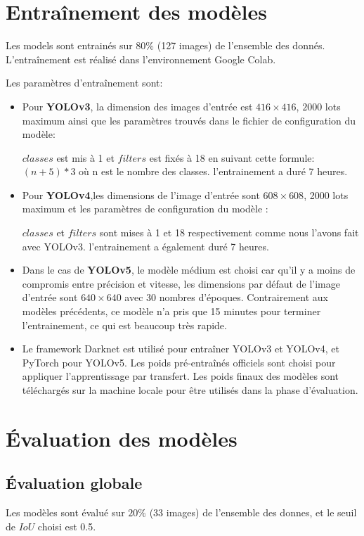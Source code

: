  
\section{Entraînement des modèles}
     Les models sont entrainés sur $80\%$ (127 images) de l'ensemble des donnés. L'entraînement est réalisé dans l'environnement Google Colab.
     
 Les paramètres d'entraînement sont: \begin{itemize}
 \item  Pour \textbf{YOLOv3}, la dimension des images d'entrée est $416\times416$, $2000$ lots maximum ainsi que les paramètres trouvés dans le fichier de configuration du modèle:
 
  $classes$ est mis à 1 et $filters$ est fixés à 18 en suivant cette formule: $(n + 5) * 3$ où n est le nombre des classes. l'entrainement a duré 7 heures.
  
 \item Pour \textbf{YOLOv4},les dimensions de l'image d'entrée sont $608\times608$, 2000 lots maximum et les paramètres de configuration du modèle :

 $classes$ et $filters$ sont mises à 1 et 18 respectivement comme nous l'avons fait avec YOLOv3. l'entrainement a également duré 7 heures.
 
 \item Dans le cas de \textbf{YOLOv5}, le modèle médium est choisi car qu'il y a moins de compromis entre précision et vitesse, les dimensions par défaut de l'image d'entrée sont $640\times640$ avec 30 nombres d'époques. Contrairement aux modèles précédents, ce modèle n'a pris que 15 minutes pour terminer l'entrainement, ce qui est beaucoup très rapide.
 
 \item Le framework Darknet est utilisé pour entraîner YOLOv3 et YOLOv4, et PyTorch pour  YOLOv5. Les poids pré-entraînés officiels sont choisi pour appliquer l'apprentissage par transfert. Les poids finaux des modèles sont téléchargés sur la machine locale pour être utilisés dans la phase d'évaluation.
 \end{itemize}


\section{Évaluation des modèles}

\subsection{Évaluation globale}
     Les modèles sont évalué sur $20\%$ (33 images) de l'ensemble des donnes, et le seuil de $IoU$ choisi est 0.5.
     
